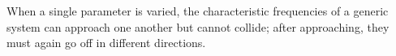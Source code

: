 When a single parameter is varied, the characteristic frequencies of a generic system can approach one another but cannot collide; after approaching, they must again go off in different directions.
